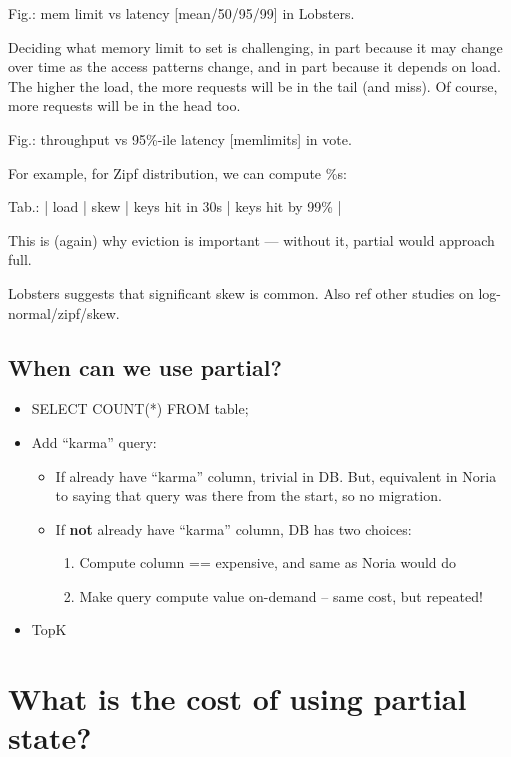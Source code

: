 Fig.: mem limit vs latency [mean/50/95/99] in Lobsters.

Deciding what memory limit to set is challenging, in part because it
may change over time as the access patterns change, and in part because
it depends on load. The higher the load, the more requests will be in
the tail (and miss). Of course, more requests will be in the head too.

Fig.: throughput vs 95\%-ile latency [memlimits] in vote.

For example, for Zipf distribution, we can compute \%s:

Tab.: | load | skew | keys hit in 30s | keys hit by 99\% | 

This is (again) why eviction is important — without it, partial would approach
full.

Lobsters suggests that significant skew is common. Also ref other
studies on log-normal/zipf/skew.

\subsection{When can we use partial?}

\begin{itemize}
 \item SELECT COUNT(*) FROM table;
 \item Add ``karma'' query:
   \begin{itemize}
    \item If already have ``karma'' column, trivial in DB. But, equivalent in
      Noria to saying that query was there from the start, so no migration.
    \item If \textbf{not} already have ``karma'' column, DB has two choices:
     \begin{enumerate}
      \item Compute column == expensive, and same as Noria would do
      \item Make query compute value on-demand -- same cost, but repeated!
     \end{enumerate}
   \end{itemize}
 \item TopK
\end{itemize}

\section{What is the cost of using partial state?}
\label{s:eval:cost}

